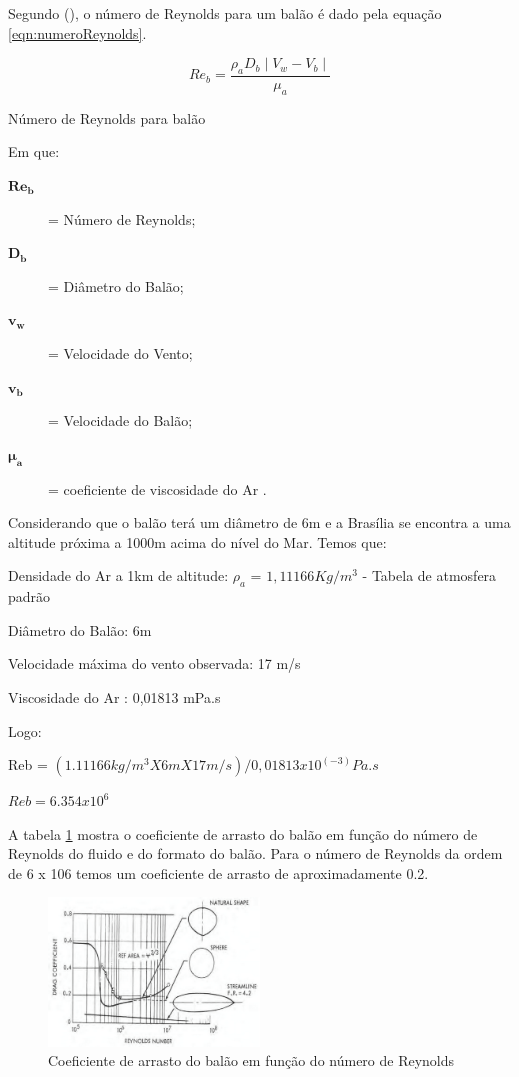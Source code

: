 	Segundo  (\citeyear{yajima}), o número de Reynolds para um balão é dado pela equação \eqref{eqn:numeroReynolds}.

	\begin{equacao}[H]
		\begin{equation}
			Re_{b} = \frac{\rho_{a} D_{b} \mid V_{w} - V_{b} \mid}{\mu_{a}}
		\end{equation}
		\caption{Número de Reynolds para balão}
		\label{eqn:numeroReynolds}
	\end{equacao}

	Em que:
	\begin{description}
		\item[$\boldsymbol{Re_{b}}$] = Número de Reynolds;
		\item[$\boldsymbol{D_{b}}$] = Diâmetro do Balão;
		\item[$\boldsymbol{v_{w}}$] = Velocidade do Vento;
		\item[$\boldsymbol{v_{b}}$] = Velocidade do Balão;
		\item[$\boldsymbol{\mu_{a}}$] = coeficiente de viscosidade do Ar .
	\end{description}

	Considerando que o balão terá um diâmetro de 6m e a Brasília se encontra a uma altitude próxima a 1000m acima do nível do Mar. Temos que:

	Densidade do Ar a 1km de altitude: $\rho_{a}$ = $1,11166 Kg/m^3$ - Tabela de atmosfera padrão~\cite{bird}

	Diâmetro do Balão: 6m

	Velocidade máxima do vento observada: 17 m/s

	Viscosidade do Ar : 0,01813 mPa.s~\cite{bird}

	Logo:

	Reb = $(1.11166 kg/m^3 X 6m X 17 m/s) / 0,01813 x 10^(-3) Pa.s$

	$Reb = 6.354 x 10^6$

	A tabela \ref{img:coeficienteArrasto} mostra o coeficiente de arrasto do balão em função do número de Reynolds do fluido e do formato do balão. Para o número de Reynolds da ordem de 6 x 106  temos um coeficiente de arrasto de aproximadamente 0.2.

	\begin{figure}[H]
		\centering
		\includegraphics[width=0.5\textwidth]{figuras/coeficienteArrasto}
		\caption[Coeficiente de arrasto do balão em função do número de Reynolds do fluido e do formato do balão]{Coeficiente de arrasto do balão em função do número de Reynolds~\cite{myers}}
		\label{img:coeficienteArrasto}
	\end{figure}

